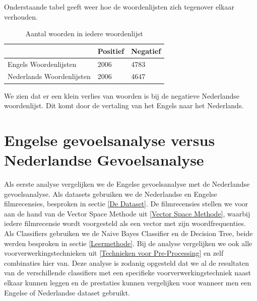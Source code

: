 Onderstaande tabel geeft weer hoe de woordenlijsten zich tegenover elkaar verhouden.

\begin{table}[h]
\centering
\caption{Aantal woorden in iedere woordenlijst}
\label{my-label}
\begin{tabular}{l|l|l|}
\cline{2-3}
 & Positief & Negatief \\ \hline
\multicolumn{1}{|l|}{Engels Woordenlijsten}     & 2006     & 4783     \\ \hline
\multicolumn{1}{|l|}{Nederlands Woordenlijsten} & 2006     & 4647     \\ \hline
\end{tabular}
\end{table}

We zien dat er een klein verlies van woorden is bij de negatieve Nederlandse woordenlijst. Dit komt door de vertaling van het Engels naar het Nederlands.

\section{Engelse gevoelsanalyse versus Nederlandse Gevoelsanalyse}\label{Engelse gevoelsanalyse versus Nederlandse Gevoelsanalyse}

Als eerste analyse vergelijken we de Engelse gevoelsanalyse met de Nederlandse gevoelsanalyse. Als datasets gebruiken we de Nederlandse en Engelse filmrecensies, besproken in sectie \ref{De Dataset}. De filmrecensies stellen we voor aan de hand van de Vector Space Methode uit \ref{Vector Space Methode}, waarbij iedere filmrecensie wordt voorgesteld als een vector met zijn woordfrequenties. Als Classifiers gebruiken we de Naive Bayes Classifier en de Decision Tree, beide werden besproken in sectie \ref{Leermethode}. Bij de analyse vergelijken we ook alle voorverwerkingstechnieken uit \ref{Technieken voor Pre-Processing} en zelf combinaties hier van. Deze analyse is zodanig opgesteld dat we al de resultaten van de verschillende classifiers met een specifieke voorverwerkingstechniek naast elkaar kunnen leggen en de prestaties kunnen vergelijken voor wanneer men een Engelse of Nederlandse dataset gebruikt.\\

